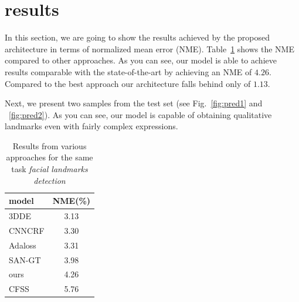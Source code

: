 \section{results}\label{sect:result}
In this section, we are going to show the results achieved by the proposed architecture in terms of normalized mean error (NME).
Table~\ref{table:results} shows the NME compared to other approaches. As you can see, our model is able to achieve results comparable with the state-of-the-art by achieving an NME of $4.26$. Compared to the best approach our architecture falls behind only of $1.13$. 

Next, we present two samples from the test set (see Fig.~\ref{fig:pred1} and ~\ref{fig:pred2}). As you can see, our model is capable of obtaining qualitative landmarks even with fairly complex expressions. 

\begin{table}\centering
    \begin{tabular}{lc}
        \toprule
        model & NME(\%) \\\midrule
        3DDE\cite{Valle19} & 3.13 \\
        CNNCRF\cite{Chen19} & 3.30 \\
        Adaloss\cite{Teixeira19} & 3.31 \\
        SAN-GT\cite{Dong18} & 3.98 \\
        ours & 4.26 \\
        CFSS\cite{Zhu16} & 5.76 \\
        \bottomrule
    \end{tabular}
    \caption{Results from various approaches for the same task \textit{facial landmarks detection}}
    \label{table:results}
\end{table}


